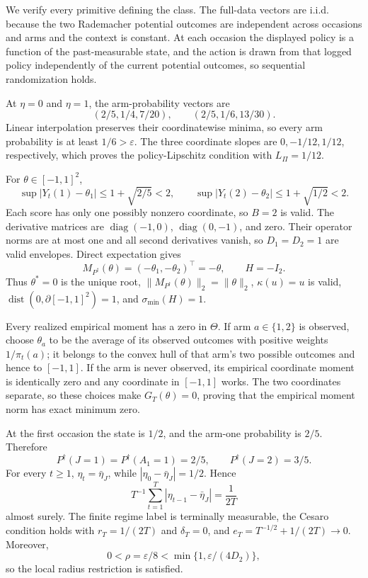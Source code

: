 We verify every primitive defining the class. The full-data vectors are i.i.d. because the two Rademacher potential outcomes are independent across occasions and arms and the context is constant. At each occasion the displayed policy is a function of the past-measurable state, and the action is drawn from that logged policy independently of the current potential outcomes, so sequential randomization holds.

At \(\eta=0\) and \(\eta=1\), the arm-probability vectors are
\[
 (2/5,1/4,7/20),\qquad(2/5,1/6,13/30). \tag{1}
\]
Linear interpolation preserves their coordinatewise minima, so every arm probability is at least \(1/6>\varepsilon\). The three coordinate slopes are \(0,-1/12,1/12\), respectively, which proves the policy-Lipschitz condition with \(L_\Pi=1/12\).

For \(\theta\in[-1,1]^2\),
\[
 \sup|Y_t(1)-\theta_1|\le1+\sqrt{2/5}<2,
 \qquad
 \sup|Y_t(2)-\theta_2|\le1+\sqrt{1/2}<2. \tag{2}
\]
Each score has only one possibly nonzero coordinate, so \(B=2\) is valid. The derivative matrices are \(\operatorname{diag}(-1,0)\), \(\operatorname{diag}(0,-1)\), and zero. Their operator norms are at most one and all second derivatives vanish, so \(D_1=D_2=1\) are valid envelopes. Direct expectation gives
\[
 M_{P^\dagger}(\theta)=(-\theta_1,-\theta_2)^\top=-\theta,
 \qquad H=-I_2. \tag{3}
\]
Thus \(\theta^*=0\) is the unique root, \(\|M_{P^\dagger}(\theta)\|_2=\|\theta\|_2\), \(\kappa(u)=u\) is valid, \(\operatorname{dist}(0,\partial[-1,1]^2)=1\), and \(\sigma_{\min}(H)=1\).

Every realized empirical moment has a zero in \(\Theta\). If arm \(a\in\{1,2\}\) is observed, choose \(\theta_a\) to be the average of its observed outcomes with positive weights \(1/\pi_t(a)\); it belongs to the convex hull of that arm's two possible outcomes and hence to \([-1,1]\). If the arm is never observed, its empirical coordinate moment is identically zero and any coordinate in \([-1,1]\) works. The two coordinates separate, so these choices make \(G_T(\theta)=0\), proving that the empirical moment norm has exact minimum zero.

At the first occasion the state is \(1/2\), and the arm-one probability is \(2/5\). Therefore
\[
 P^\dagger(J=1)=P^\dagger(A_1=1)=2/5,
 \qquad P^\dagger(J=2)=3/5. \tag{4}
\]
For every \(t\ge1\), \(\eta_t=\bar\eta_J\), while \(|\eta_0-\bar\eta_J|=1/2\). Hence
\[
 T^{-1}\sum_{t=1}^T|\eta_{t-1}-\bar\eta_J|=\frac1{2T} \tag{5}
\]
almost surely. The finite regime label is terminally measurable, the Cesaro condition holds with \(r_T=1/(2T)\) and \(\delta_T=0\), and \(e_T=T^{-1/2}+1/(2T)\to0\). Moreover,
\[
 0<\rho=\varepsilon/8<\min\{1,\varepsilon/(4D_2)\}, \tag{6}
\]
so the local radius restriction is satisfied.


